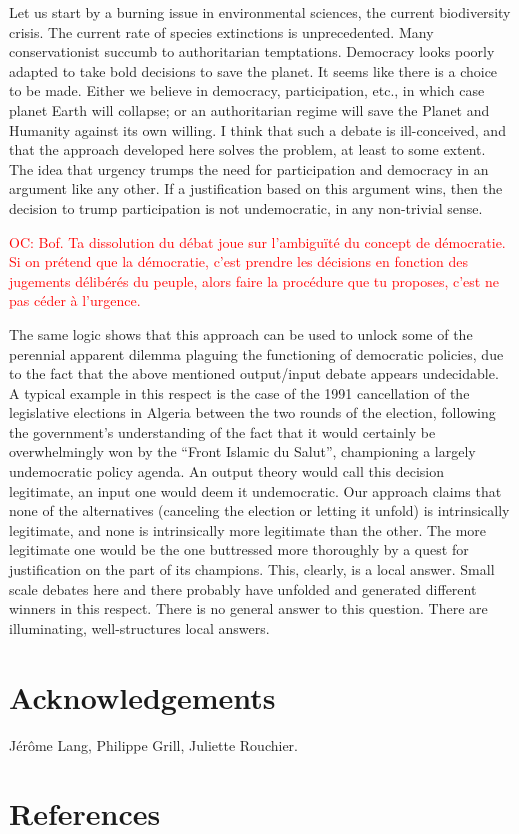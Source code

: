 \documentclass[preprint,11pt]{elsarticle}
\newcommand{\commentOC}[1]{\textcolor{red}{OC: #1}}
\begin{document}
Let us start by a burning issue in environmental sciences, the current biodiversity crisis. The current rate of species extinctions is unprecedented. Many conservationist succumb to authoritarian temptations. Democracy looks poorly adapted to take bold decisions to save the planet. It seems like there is a choice to be made. Either we believe in democracy, participation, etc., in which case planet Earth will collapse; or an authoritarian regime will save the Planet and Humanity against its own willing. I think that such a debate is ill-conceived, and that the approach developed here solves the problem, at least to some extent. The idea that urgency trumps the need for participation and democracy in an argument like any other. If a justification based on this argument wins, then the decision to trump participation is not undemocratic, in any non-trivial sense.

\commentOC{ Bof. Ta dissolution du débat joue
sur l’ambiguïté du concept de démocratie. Si on prétend que
la démocratie, c’est prendre les décisions en fonction des
jugements délibérés du peuple, alors faire la procédure que
tu proposes, c’est ne pas céder à l’urgence.}

The same logic shows that this approach can be used to unlock some of the perennial apparent dilemma plaguing the functioning of democratic policies, due to the fact that the above mentioned output/input debate appears undecidable. A typical example in this respect is the case of the 1991 cancellation of the legislative elections in Algeria between the two rounds of the election, following the government’s understanding of the fact that it would certainly be overwhelmingly won by the “Front Islamic du Salut”, championing a largely undemocratic policy agenda. An output theory would call this decision legitimate, an input one would deem it undemocratic. Our approach claims that none of the alternatives (canceling the election or letting it unfold) is intrinsically legitimate, and none is intrinsically more legitimate than the other. The more legitimate one would be the one buttressed more thoroughly by a quest for justification on the part of its champions. This, clearly, is a local answer. Small scale debates here and there probably have unfolded and generated different winners in this respect. There is no general answer to this question. There are illuminating, well-structures local answers.


\section*{Acknowledgements}
Jérôme Lang, Philippe Grill, Juliette Rouchier.

\section*{References}




\end{document}
